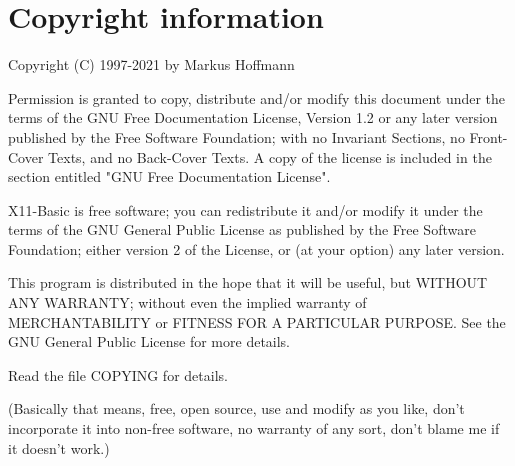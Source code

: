 \section*{Copyright information}

Copyright (C) 1997-2021 by Markus Hoffmann 

Permission is granted to copy, distribute and/or modify this document
under the terms of the GNU Free Documentation License, Version 1.2
or any later version published by the Free Software Foundation;
with no Invariant Sections, no Front-Cover Texts, and no Back-Cover Texts.
A copy of the license is included in the section entitled "GNU
Free Documentation License".

X11-Basic is free software; you can redistribute it and/or modify it under the
terms of the GNU General Public License as published by the Free Software
Foundation; either version 2 of the License, or (at your option) any later
version.

This program is distributed in the hope that it will be useful, but WITHOUT ANY
WARRANTY; without even the implied warranty of MERCHANTABILITY or FITNESS FOR
A PARTICULAR PURPOSE. See the GNU General Public License for more details.

Read the file COPYING for details.

(Basically that means, free, open source, use and modify as you like, don't
incorporate it into non-free software, no warranty of any sort, don't blame me
if it doesn't work.)
